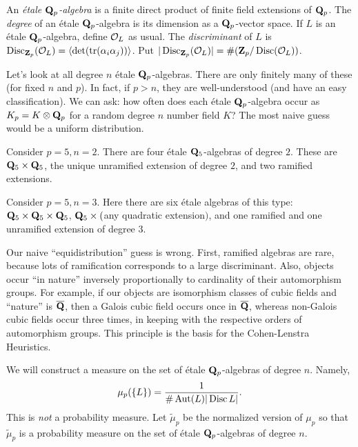 \begin{defi}
An \emph{\'etale $\mathbf{Q}_p$-algebra} is a finite direct product of finite field 
extensions of $\mathbf{Q}_p$. The \emph{degree} of an \'etale $\mathbf{Q}_p$-algebra is its 
dimension as a $\mathbf{Q}_p$-vector space. If $L$ is an \'etale $\mathbf{Q}_p$-algebra, 
define $\mathcal{O}_L$ as usual. The \emph{discriminant} of $L$ is 
$\operatorname{Disc}_{\mathbf{Z}_p}(\mathcal{O}_L) = \langle \det(\operatorname{tr}(\alpha_i \alpha_j))\rangle$.
Put $|\operatorname{Disc}_{\mathbf{Z}_p}(\mathcal{O}_L)| = \#(\mathbf{Z}_p/\operatorname{Disc}(\mathcal{O}_L))$.  
\end{defi}

Let's look at all degree $n$ \'etale $\mathbf{Q}_p$-algebras. There are only finitely 
many of these (for fixed $n$ and $p$). In fact, if $p>n$, they are 
well-understood (and have an easy classification). We can ask: how often does 
each \'etale $\mathbf{Q}_p$-algebra occur as $K_p=K\otimes\mathbf{Q}_p$ for a random degree 
$n$ number field $K$? The most naive guess would be a uniform distribution. 

\begin{example}
Consider $p=5,n=2$. There are four \'etale $\mathbf{Q}_5$-algebras of degree $2$. 
These are $\mathbf{Q}_5\times \mathbf{Q}_5$, the unique unramified extension of degree $2$, 
and two ramified extensions. 
\end{example}

\begin{example}
Consider $p=5,n=3$. Here there are six \'etale algebras of this type: 
$\mathbf{Q}_5\times \mathbf{Q}_5\times \mathbf{Q}_5$, $\mathbf{Q}_5\times($any quadratic extension$)$, and one 
ramified and one unramified extension of degree $3$.
\end{example}

Our naive ``equidistribution'' guess is wrong. First, ramified algebras are 
rare, because lots of ramification corresponds to a large discriminant. Also, 
objects occur ``in nature'' inversely proportionally to cardinality of their 
automorphism groups. For example, if our objects are isomorphism classes of 
cubic fields and ``nature'' is $\overline{\mathbf{Q}}$, then a Galois cubic field
occurs once in $\overline{\mathbf{Q}}$, whereas non-Galois cubic fields occur three 
times, in keeping with the respective orders of automorphism groups. This 
principle is the basis for the Cohen-Lenstra Heuristics. 

We will construct a measure on the set of \'etale $\mathbf{Q}_p$-algebras of degree 
$n$. Namely, 
\[
  \mu_p(\{L\}) = \frac{1}{\# \operatorname{Aut}(L)|\operatorname{Disc} L|} .
\]
This is \emph{not} a probability measure. Let $\widetilde \mu_p$ be the 
normalized version of $\mu_p$ so that $\widetilde\mu_p$ is a probability 
measure on the set of \'etale $\mathbf{Q}_p$-algebras of degree $n$. 

